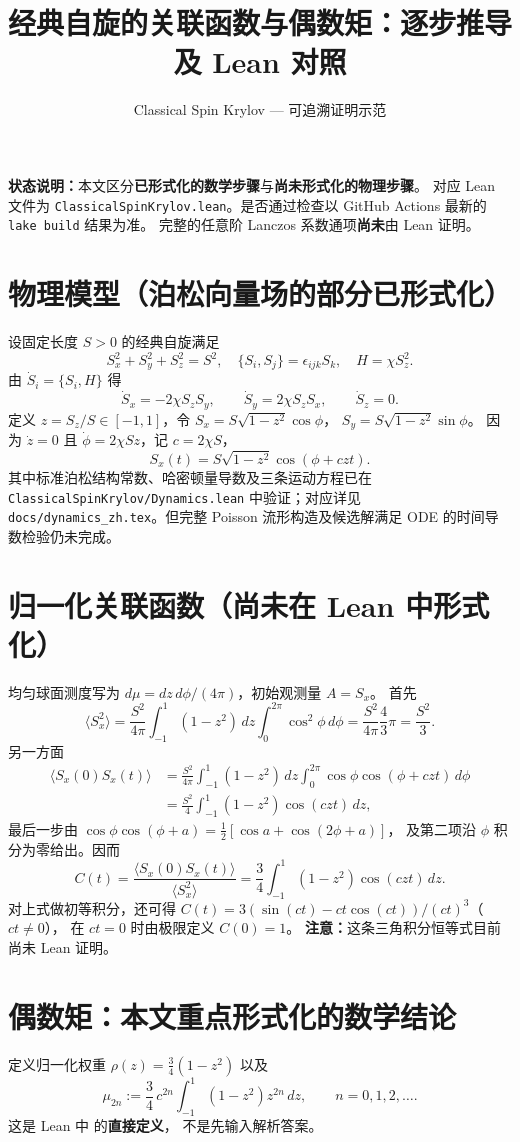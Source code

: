 \documentclass[UTF8,11pt]{ctexart}
\title{经典自旋的关联函数与偶数矩：逐步推导及 Lean 对照}
\author{Classical Spin Krylov — 可追溯证明示范}
\date{}
\newcommand{\LeanRef}[1]{\texttt{\detokenize{#1}}}
\begin{document}
\maketitle
\noindent\textbf{状态说明：}本文区分\textbf{已形式化的数学步骤}与\textbf{尚未形式化的物理步骤}。
对应 Lean 文件为 \texttt{ClassicalSpinKrylov.lean}。是否通过检查以 GitHub Actions 最新的 \texttt{lake build} 结果为准。
完整的任意阶 Lanczos 系数通项\textbf{尚未}由 Lean 证明。

\section{物理模型（泊松向量场的部分已形式化）}
设固定长度 $S>0$ 的经典自旋满足
\[
 S_x^2+S_y^2+S_z^2=S^2,\quad
 \{S_i,S_j\}=\epsilon_{ijk}S_k,\quad H=\chi S_z^2.
\]
由 $\dot S_i=\{S_i,H\}$ 得
\[
 \dot S_x=-2\chi S_zS_y,\qquad
 \dot S_y= 2\chi S_zS_x,\qquad \dot S_z=0.
\]
定义 $z=S_z/S\in[-1,1]$，令
$S_x=S\sqrt{1-z^2}\cos\phi$，
$S_y=S\sqrt{1-z^2}\sin\phi$。
因为 $\dot z=0$ 且 $\dot\phi=2\chi Sz$，记 $c=2\chi S$，
\[
 S_x(t)=S\sqrt{1-z^2}\cos(\phi+czt).
\]
其中标准泊松结构常数、哈密顿量导数及三条运动方程已在 \texttt{ClassicalSpinKrylov/Dynamics.lean} 中验证；对应详见 \texttt{docs/dynamics\_zh.tex}。但完整 Poisson 流形构造及候选解满足 ODE 的时间导数检验仍未完成。

\section{归一化关联函数（尚未在 Lean 中形式化）}
均匀球面测度写为 $d\mu=dz\,d\phi/(4\pi)$，初始观测量 $A=S_x$。
首先
\[
 \langle S_x^2\rangle=
 \frac{S^2}{4\pi}\int_{-1}^{1}(1-z^2)\,dz
 \int_0^{2\pi}\cos^2\phi\,d\phi
 =\frac{S^2}{4\pi}\frac43\pi=\frac{S^2}{3}.
\]
另一方面
\[
 \begin{aligned}
 \langle S_x(0)S_x(t)\rangle
 &=\frac{S^2}{4\pi}\int_{-1}^1(1-z^2)\,dz
  \int_0^{2\pi}\cos\phi\cos(\phi+czt)\,d\phi\\
 &=\frac{S^2}{4}\int_{-1}^1(1-z^2)\cos(czt)\,dz,
 \end{aligned}
\]
最后一步由
$\cos\phi\cos(\phi+a)=\tfrac12[\cos a+\cos(2\phi+a)]$，
及第二项沿 $\phi$ 积分为零给出。因而
\[
 C(t)=\frac{\langle S_x(0)S_x(t)\rangle}{\langle S_x^2\rangle}
 =\frac34\int_{-1}^1(1-z^2)\cos(czt)\,dz.
\]
对上式做初等积分，还可得
$C(t)=3(\sin(ct)-ct\cos(ct))/(ct)^3$（$ct\ne0$），
在 $ct=0$ 时由极限定义 $C(0)=1$。
\textbf{注意：}这条三角积分恒等式目前尚未 Lean 证明。

\section{偶数矩：本文重点形式化的数学结论}
定义归一化权重 $\rho(z)=\tfrac34(1-z^2)$ 以及
\[
 \mu_{2n}:=\frac34\,c^{2n}\int_{-1}^1(1-z^2)z^{2n}\,dz,
 \qquad n=0,1,2,\dots.
\]
这是 Lean 中 \LeanRef{evenMoment} 的\textbf{直接定义}，
不是先输入解析答案。
\end{document}
